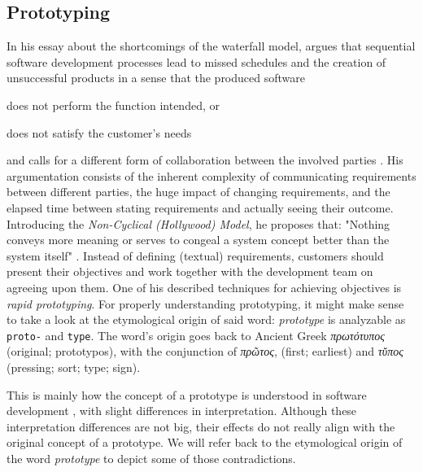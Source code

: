 \subsection{Prototyping}
\label{sec:prototyping}
In his essay  \cite{gladden_stop_1982} about the shortcomings of the waterfall model, \citeauthor{gladden_stop_1982} argues that sequential software development processes lead to missed schedules and the creation of unsuccessful products in a sense that the produced software \begin{enumerate*}[label=(\roman*)]
\item does not perform the function intended, or
\item does not satisfy the customer's needs
\end{enumerate*}
and calls for a different form of collaboration between the involved parties \cite{gladden_stop_1982}.
His argumentation consists of the inherent complexity of communicating requirements between different parties, the huge impact of changing requirements, and the elapsed time between stating requirements and actually seeing their outcome.
Introducing the \emph{Non-Cyclical (Hollywood) Model}, he proposes that: "Nothing conveys more meaning or serves to congeal a system concept better than the system itself" \cite{gladden_stop_1982}.
Instead of defining (textual) requirements, customers should present their objectives and work together with the development team on agreeing upon them.
One of his described techniques for achieving objectives is \emph{rapid prototyping}.
For properly understanding prototyping, it might make sense to take a look at the etymological origin of said word: \emph{prototype} is analyzable as \texttt{proto-} and \texttt{type}.
The word's origin goes back to Ancient Greek \emph{\textgreek{πρωτότυπος}} (original; prototypos), with the conjunction of \emph{\textgreek{πρῶτος}}, (first; earliest) and \emph{\textgreek{τῠπος}} (pressing; sort; type; sign). %

This is mainly how the concept of a prototype is understood in software development \cite{budde_what_1992}, with slight differences in interpretation.
Although these interpretation differences are not big, their effects do not really align with the original concept of a prototype.
We will refer back to the etymological origin of the word \emph{prototype} to depict some of those contradictions.

